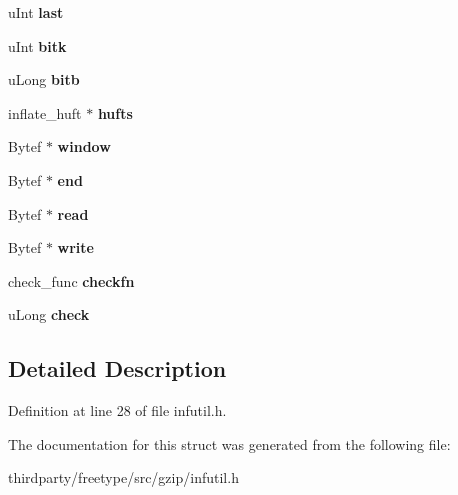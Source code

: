 \begin{DoxyCompactItemize}
\begin{tabbing}
\end{tabbing}\item 
\mbox{\label{structinflate__blocks__state_aff9036e9472bff599712d2cabbae8efb}} 
u\+Int {\bfseries last}
\item 
\mbox{\label{structinflate__blocks__state_aa746d10a5f7cab2603c2282c24a10a94}} 
u\+Int {\bfseries bitk}
\item 
\mbox{\label{structinflate__blocks__state_a14a41e3af6a60ac4bc69e299820a3999}} 
u\+Long {\bfseries bitb}
\item 
\mbox{\label{structinflate__blocks__state_a81d8f6825a3a5c42e29882ae444b80c0}} 
inflate\+\_\+huft $\ast$ {\bfseries hufts}
\item 
\mbox{\label{structinflate__blocks__state_a9585c3f7e1653e8bf31685b8fc4bb5da}} 
Bytef $\ast$ {\bfseries window}
\item 
\mbox{\label{structinflate__blocks__state_a3e7b6ce115fec031c6413fc7259f0206}} 
Bytef $\ast$ {\bfseries end}
\item 
\mbox{\label{structinflate__blocks__state_a9508224b8104718e7a576149586b9b77}} 
Bytef $\ast$ {\bfseries read}
\item 
\mbox{\label{structinflate__blocks__state_a82ae3c57d9b8acffa4deb7e4a9354297}} 
Bytef $\ast$ {\bfseries write}
\item 
\mbox{\label{structinflate__blocks__state_af1238e2d5076a2b3c0d21430252e890c}} 
check\+\_\+func {\bfseries checkfn}
\item 
\mbox{\label{structinflate__blocks__state_a917b3b14339ec368de13c3ba07c1711e}} 
u\+Long {\bfseries check}
\end{DoxyCompactItemize}


\subsection{Detailed Description}


Definition at line 28 of file infutil.\+h.



The documentation for this struct was generated from the following file\+:\begin{DoxyCompactItemize}
\item 
thirdparty/freetype/src/gzip/infutil.\+h\end{DoxyCompactItemize}
